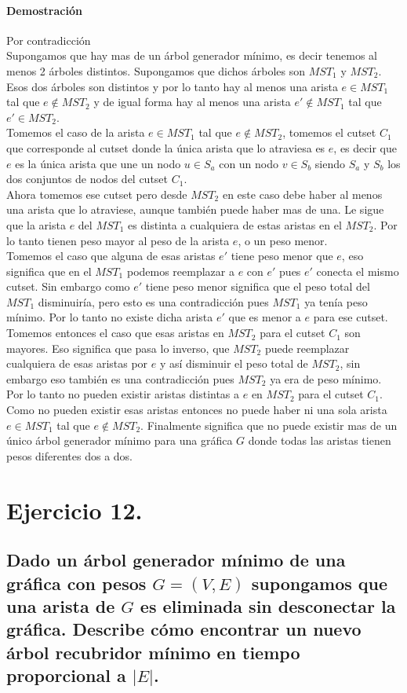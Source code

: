 \documentclass[12pt]{article}
\begin{document}
\paragraph{Demostración} Por contradicción\\
Supongamos que hay mas de un árbol generador mínimo, es decir tenemos al menos 2 árboles distintos. Supongamos que dichos árboles son $MST_1$ y $MST_2$. Esos dos árboles son distintos y por lo tanto hay al menos una arista $e \in MST_1$ tal que $e\notin MST_2$ y de igual forma hay al menos una arista $e' \notin MST_1$ tal que $e'\in MST_2$.\\
Tomemos el caso de la  arista $e \in MST_1$ tal que $e\notin MST_2$, tomemos el cutset $C_1$ que corresponde al cutset donde la única arista que lo atraviesa es $e$, es decir que $e$ es la única arista que une un nodo $u\in S_a$ con un nodo $v\in S_b$ siendo $S_a$ y $S_b$ los dos conjuntos de nodos del cutset $C_1$.\\
Ahora tomemos ese cutset pero desde $MST_2$ en este caso debe haber al menos una arista que lo atraviese, aunque también puede haber mas de una. Le sigue que la arista $e$ del $MST_1$ es distinta a cualquiera de estas aristas en el $MST_2$. Por lo tanto tienen peso mayor al peso de la arista $e$, o un peso menor.\\ Tomemos el caso que alguna de esas aristas $e'$ tiene peso menor que $e$, eso significa que en el $MST_1$ podemos reemplazar a $e$ con $e'$ pues $e'$ conecta el mismo cutset. Sin embargo como $e'$ tiene peso menor significa que el peso total del $MST_1$ disminuiría, pero esto es una contradicción pues $MST_1$ ya tenía peso mínimo. Por lo tanto no existe dicha arista $e'$ que es menor a $e$ para ese cutset. Tomemos entonces el caso que esas aristas en $MST_2$ para el cutset $C_1$ son mayores. Eso significa que pasa lo inverso, que $MST_2$ puede reemplazar cualquiera de esas aristas por $e$ y así disminuir el peso total de $MST_2$, sin embargo eso también es una contradicción pues $MST_2$ ya era de peso mínimo. Por lo tanto no pueden existir aristas distintas a $e$ en $MST_2$  para el cutset $C_1$. Como no pueden existir esas aristas entonces no puede haber ni una sola arista $e\in MST_1$ tal que $e\notin MST_2$. Finalmente significa que no puede existir mas de un único árbol generador mínimo para una gráfica $G$ donde todas las aristas tienen pesos diferentes dos a dos.
\section{Ejercicio 12.}
\subsection{Dado un árbol generador mínimo de una gráfica con pesos $G=(V,E)$ supongamos que una arista de $G$ es eliminada sin desconectar la gráfica. Describe cómo encontrar un nuevo árbol recubridor mínimo en tiempo proporcional a $|E|$.}
\end{document}
